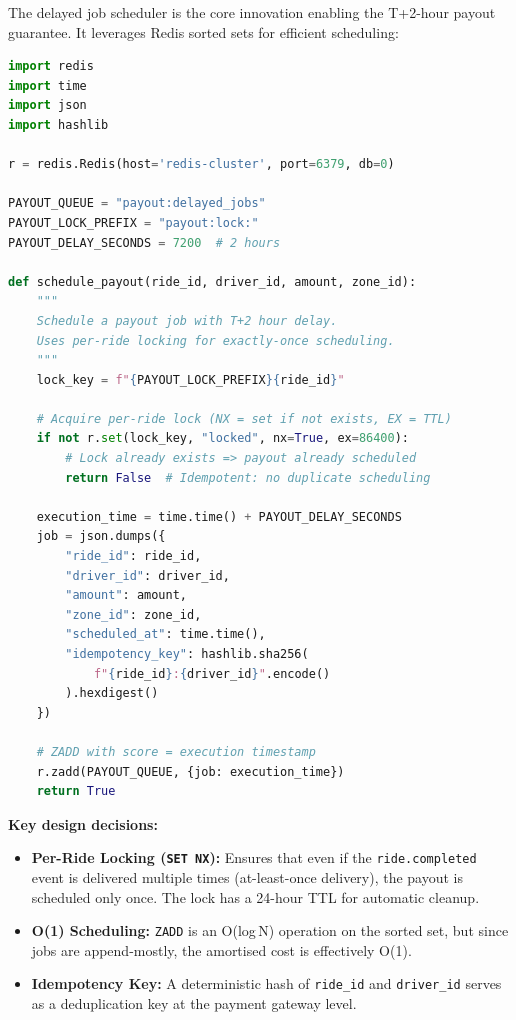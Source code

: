 \documentclass[12pt,a4paper,oneside]{report}
\begin{document}
The delayed job scheduler is the core innovation enabling the T+2-hour payout guarantee. It leverages Redis sorted sets for efficient scheduling:

\begin{lstlisting}[language=Python, caption={Delayed Job Scheduling Logic}]
import redis
import time
import json
import hashlib

r = redis.Redis(host='redis-cluster', port=6379, db=0)

PAYOUT_QUEUE = "payout:delayed_jobs"
PAYOUT_LOCK_PREFIX = "payout:lock:"
PAYOUT_DELAY_SECONDS = 7200  # 2 hours

def schedule_payout(ride_id, driver_id, amount, zone_id):
    """
    Schedule a payout job with T+2 hour delay.
    Uses per-ride locking for exactly-once scheduling.
    """
    lock_key = f"{PAYOUT_LOCK_PREFIX}{ride_id}"

    # Acquire per-ride lock (NX = set if not exists, EX = TTL)
    if not r.set(lock_key, "locked", nx=True, ex=86400):
        # Lock already exists => payout already scheduled
        return False  # Idempotent: no duplicate scheduling

    execution_time = time.time() + PAYOUT_DELAY_SECONDS
    job = json.dumps({
        "ride_id": ride_id,
        "driver_id": driver_id,
        "amount": amount,
        "zone_id": zone_id,
        "scheduled_at": time.time(),
        "idempotency_key": hashlib.sha256(
            f"{ride_id}:{driver_id}".encode()
        ).hexdigest()
    })

    # ZADD with score = execution timestamp
    r.zadd(PAYOUT_QUEUE, {job: execution_time})
    return True
\end{lstlisting}

\textbf{Key design decisions:}
\begin{itemize}
    \item \textbf{Per-Ride Locking (\texttt{SET NX}):} Ensures that even if the \texttt{ride.completed} event is delivered multiple times (at-least-once delivery), the payout is scheduled only once. The lock has a 24-hour TTL for automatic cleanup.
    \item \textbf{O(1) Scheduling:} \texttt{ZADD} is an O(log\,N) operation on the sorted set, but since jobs are append-mostly, the amortised cost is effectively O(1).
    \item \textbf{Idempotency Key:} A deterministic hash of \texttt{ride\_id} and \texttt{driver\_id} serves as a deduplication key at the payment gateway level.
\end{itemize}
\end{document}
